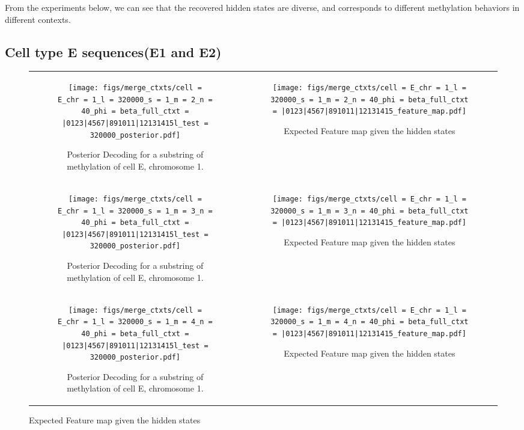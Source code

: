 \documentclass{article}
\begin{document}
From the experiments below, we can see that the recovered hidden states are diverse,
and corresponds to different methylation behaviors in different contexts.


\subsection{Cell type E sequences(E1 and E2)}
\begin{figure}[H]
    \begin{tabular}{cc}
      \begin{subfigure}[t]{0.4\textwidth}
        \texttt{[image: figs/merge\_ctxts/cell = E\_chr = 1\_l = 320000\_s = 1\_m = 2\_n = 40\_phi = beta\_full\_ctxt = |0123|4567|891011|12131415l\_test = 320000\_posterior.pdf]}
        \caption{Posterior Decoding for a substring of methylation of cell E, chromosome 1.}
      \end{subfigure}
      &
      \begin{subfigure}[t]{0.6\textwidth}
        \texttt{[image: figs/merge\_ctxts/cell = E\_chr = 1\_l = 320000\_s = 1\_m = 2\_n = 40\_phi = beta\_full\_ctxt = |0123|4567|891011|12131415\_feature\_map.pdf]}
        \caption{Expected Feature map given the hidden states}
      \end{subfigure}
      \\
      \begin{subfigure}[t]{0.4\textwidth}
        \texttt{[image: figs/merge\_ctxts/cell = E\_chr = 1\_l = 320000\_s = 1\_m = 3\_n = 40\_phi = beta\_full\_ctxt = |0123|4567|891011|12131415l\_test = 320000\_posterior.pdf]}
        \caption{Posterior Decoding for a substring of methylation of cell E, chromosome 1.}
      \end{subfigure}
      &
      \begin{subfigure}[t]{0.6\textwidth}
        \texttt{[image: figs/merge\_ctxts/cell = E\_chr = 1\_l = 320000\_s = 1\_m = 3\_n = 40\_phi = beta\_full\_ctxt = |0123|4567|891011|12131415\_feature\_map.pdf]}
        \caption{Expected Feature map given the hidden states}
      \end{subfigure}
      \\
      \begin{subfigure}[t]{0.4\textwidth}
        \texttt{[image: figs/merge\_ctxts/cell = E\_chr = 1\_l = 320000\_s = 1\_m = 4\_n = 40\_phi = beta\_full\_ctxt = |0123|4567|891011|12131415l\_test = 320000\_posterior.pdf]}
        \caption{Posterior Decoding for a substring of methylation of cell E, chromosome 1.}
      \end{subfigure}
      &
      \begin{subfigure}[t]{0.6\textwidth}
        \texttt{[image: figs/merge\_ctxts/cell = E\_chr = 1\_l = 320000\_s = 1\_m = 4\_n = 40\_phi = beta\_full\_ctxt = |0123|4567|891011|12131415\_feature\_map.pdf]}
        \caption{Expected Feature map given the hidden states}
      \end{subfigure}
  \end{tabular}
\end{figure}
\end{document}

